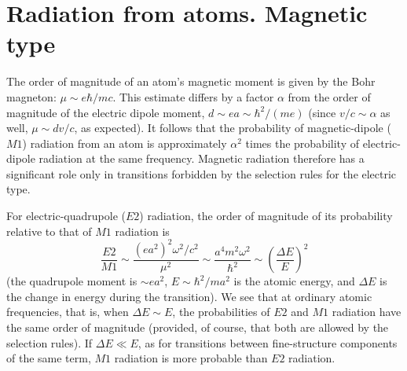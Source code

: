 \section{Radiation from atoms. Magnetic type}

The order of magnitude of an atom's magnetic moment is given by the Bohr magneton: $\mu\sim e\hbar/mc$. This estimate differs by a factor $\alpha$ from the order of magnitude of the electric dipole moment, $d\sim ea\sim\hbar^2/(me)$ (since $v/c\sim\alpha$ as well, $\mu\sim dv/c$, as
expected). It follows that the probability of magnetic-dipole ($M1$) radiation from an atom is approximately $\alpha^2$ times the probability of electric-dipole radiation at the same frequency. Magnetic radiation therefore has a significant role only in transitions forbidden by the selection rules for the electric type.

For electric-quadrupole ($E2$) radiation, the order of magnitude of its probability relative to that of $M1$ radiation is
\begin{equation}
\frac{E2}{M1}\sim\frac{(ea^2)^2\omega^2/c^2}{\mu^2}
\sim\frac{a^4m^2\omega^2}{\hbar^2}
\sim\left(\frac{\Delta E}{E}\right)^2
\tag{50.1}
\end{equation}
(the quadrupole moment is $\sim ea^2$, $E\sim\hbar^2/ma^2$ is the atomic energy, and $\Delta E$ is the change in energy during the transition). We see that at ordinary atomic frequencies, that is, when $\Delta E\sim E$, the probabilities of $E2$ and $M1$ radiation have the same order of magnitude (provided, of course, that both are allowed by the selection rules). If $\Delta E\ll E$, as for transitions between fine-structure components of the same term, $M1$ radiation is more probable than $E2$ radiation.

